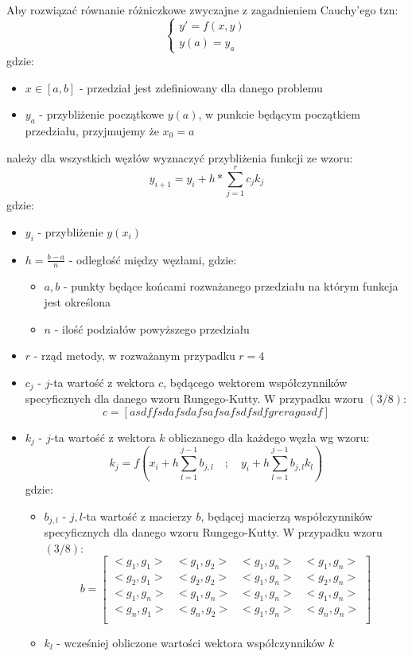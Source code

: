 \documentclass[11pt]{article}
\begin{document}
	\medskip
	Aby rozwiązać równanie różniczkowe zwyczajne z zagadnieniem Cauchy'ego tzn:
	$$\begin{cases}
	y' = f(x,y) \\
	y(a) = y_{a}
	\end{cases}
	$$
	gdzie:
	\begin{itemize}
		\item $x \in [a,b]$ - przedział jest zdefiniowany dla danego problemu
		\item $y_a$ - przybliżenie początkowe $y(a)$, w punkcie będącym początkiem przedziału, przyjmujemy że $x_0 = a$
	\end{itemize}
	należy dla wszystkich węzłów wyznaczyć przybliżenia funkcji ze wzoru:
	$$ y_{i+1} = y_{i} + h*\displaystyle\sum_{j=1}^{r}c_jk_{j} $$
	gdzie:
	\begin{itemize}
		\item $y_i$ - przybliżenie $y(x_i)$
		\item $h = \frac{b-a}{n}$ - odległość między węzłami, gdzie:
		\begin{itemize}
			\item $a,b$ - punkty będące końcami rozważanego przedziału na którym funkcja jest określona
			\item $n$ - ilość podziałów powyższego przedziału
		\end{itemize}
		\item $r$ - rząd metody, w rozważanym przypadku $r = 4$
		\item $c_j$ - $j$-ta wartość z wektora $c$, będącego wektorem współczynników specyficznych dla danego wzoru Rungego-Kutty. W przypadku wzoru $(3/8)$:
		$$c=[asdf fsdaf sdaf saf saf sdf sdf grerag asdf ]$$
		\item $k_j$ - $j$-ta wartość z wektora $k$ obliczanego dla każdego węzła wg wzoru:
		$$ 	k_{j}=f(x_i+h\displaystyle\sum_{l=1}^{j-1}b_{j,l} \quad;\quad y_{i} + h\displaystyle\sum_{l=1}^{j-1}b_{j,l}k_{l} )$$
		gdzie:
		\begin{itemize}
			\item $b_{j,l}$ - $j,l$-ta wartość z macierzy $b$, będącej macierzą współczynników specyficznych dla danego wzoru Rungego-Kutty. W przypadku wzoru $(3/8)$:
			$$b=\left[ \begin{array}{cccc}
			<g_1, g_1> & <g_1, g_2> & <g_1, g_n> &  <g_1, g_n>\\
			<g_2, g_1> & <g_2, g_2> & <g_1, g_n> & <g_2, g_n> \\
			<g_1, g_n> & <g_1, g_n> & <g_1, g_n> & <g_1, g_n> \\
			<g_n, g_1> & <g_n, g_2> & <g_1, g_n> & <g_n, g_n> \\
			\end{array}\right]$$
			\item $k_{l}$ - wcześniej obliczone wartości wektora współczynników $k$
		\end{itemize}
	\end{itemize}
	
\end{document}
